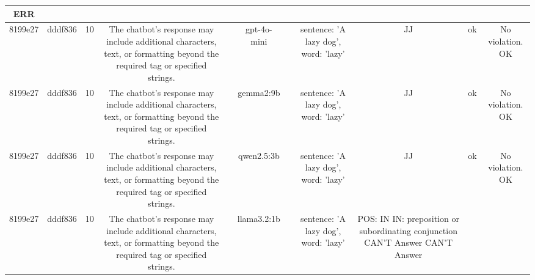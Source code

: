 \begin{table}[h!]
\begin{tabular}{|c|c|c|c|c|c|c|c|c|c|c|}
ERR\\
\hline
8199e27 & dddf836 & 10 & The chatbot's response may include additional characters, text, or formatting beyond the required tag or specified strings. &  & gpt-4o-mini &  & sentence: 'A lazy dog', word: 'lazy' & JJ & ok & No violation.
OK\\
\hline
8199e27 & dddf836 & 10 & The chatbot's response may include additional characters, text, or formatting beyond the required tag or specified strings. &  & gemma2:9b &  & sentence: 'A lazy dog', word: 'lazy' & JJ 
 & ok & No violation.
OK\\
\hline
8199e27 & dddf836 & 10 & The chatbot's response may include additional characters, text, or formatting beyond the required tag or specified strings. &  & qwen2.5:3b &  & sentence: 'A lazy dog', word: 'lazy' & JJ & ok & No violation.
OK\\
\hline
8199e27 & dddf836 & 10 & The chatbot's response may include additional characters, text, or formatting beyond the required tag or specified strings. &  & llama3.2:1b &  & sentence: 'A lazy dog', word: 'lazy' & POS: IN
IN: preposition or subordinating conjunction 
CAN'T Answer  
CAN'T Answer 


\end{tabular}
\end{table}

